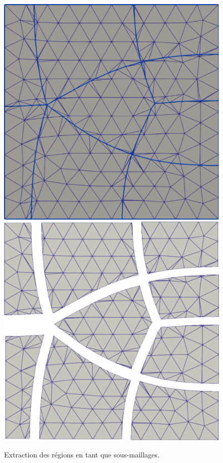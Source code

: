 \begin{figure}[!h]
\centering
\includegraphics[scale=0.29]{images/eclatement_2.pdf}
\hfill
\includegraphics[scale=0.352]{images/eclatement_3.pdf}
\caption{Extraction des régions en tant que sous-maillages.}
\label{fig:eclatement}
\end{figure}

